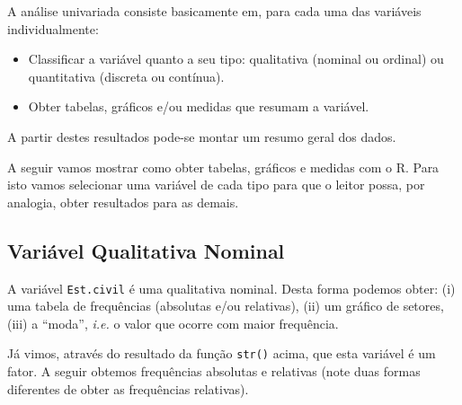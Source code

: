 \documentclass[10pt,a4paper]{book}
\newenvironment{Shaded}{\begin{snugshade}}{\end{snugshade}}
\newcommand{\KeywordTok}[1]{\textcolor[rgb]{0.13,0.29,0.53}{\textbf{#1}}}
\newcommand{\DecValTok}[1]{\textcolor[rgb]{0.00,0.00,0.81}{#1}}
\newcommand{\FloatTok}[1]{\textcolor[rgb]{0.00,0.00,0.81}{#1}}
\newcommand{\StringTok}[1]{\textcolor[rgb]{0.31,0.60,0.02}{#1}}
\newcommand{\OperatorTok}[1]{\textcolor[rgb]{0.81,0.36,0.00}{\textbf{#1}}}
\newcommand{\NormalTok}[1]{#1}
\providecommand{\tightlist}{%
  \setlength{\itemsep}{0pt}\setlength{\parskip}{0pt}}
\begin{document}
A análise univariada consiste basicamente em, para cada uma das
variáveis individualmente:

\begin{itemize}
\tightlist
\item
  Classificar a variável quanto a seu tipo: qualitativa (nominal ou
  ordinal) ou quantitativa (discreta ou contínua).
\item
  Obter tabelas, gráficos e/ou medidas que resumam a variável.
\end{itemize}

A partir destes resultados pode-se montar um resumo geral dos dados.

A seguir vamos mostrar como obter tabelas, gráficos e medidas com o R.
Para isto vamos selecionar uma variável de cada tipo para que o leitor
possa, por analogia, obter resultados para as demais.

\subsection{Variável Qualitativa
Nominal}\label{variuxe1vel-qualitativa-nominal}

A variável \texttt{Est.civil} é uma qualitativa nominal. Desta forma
podemos obter: (i) uma tabela de frequências (absolutas e/ou relativas),
(ii) um gráfico de setores, (iii) a ``moda'', \emph{i.e.} o valor que
ocorre com maior frequência.

Já vimos, através do resultado da função \texttt{str()} acima, que esta
variável é um fator. A seguir obtemos frequências absolutas e relativas
(note duas formas diferentes de obter as frequências relativas).

\begin{Shaded}
\end{Shaded}
\end{document}
